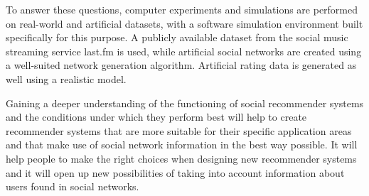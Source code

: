To answer these questions, computer experiments and simulations are performed on real-world and artificial datasets, with a software simulation environment built specifically for this purpose. A publicly available dataset from the social music streaming service last.fm is used, while artificial social networks are created using a well-suited network generation algorithm. Artificial rating data is generated as well using a realistic model.
\newline

Gaining a deeper understanding of the functioning of social recommender systems and the conditions under which they perform best will help to create recommender systems that are more suitable for their specific application areas and that make use of social network information in the best way possible. It will help people to make the right choices when designing new recommender systems and it will open up new possibilities of taking into account information about users found in social networks.
